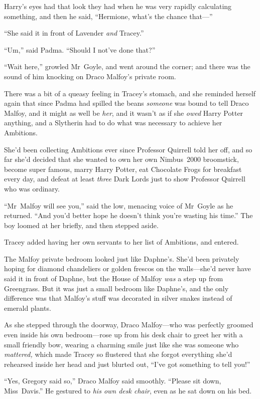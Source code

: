 Harry’s eyes had that look they had when he was very rapidly calculating something, and then he said, “Hermione, what’s the chance that—”

“She said it in front of Lavender \emph{and} Tracey.”

“Um,” said Padma. “Should I not’ve done that?”

\later

“Wait here,” growled Mr~Goyle, and went around the corner; and there was the sound of him knocking on Draco Malfoy’s private room.

There was a bit of a queasy feeling in Tracey’s stomach, and she reminded herself again that since Padma had spilled the beans \emph{someone} was bound to tell Draco Malfoy, and it might as well be \emph{her}, and it wasn’t as if she \emph{owed} Harry Potter anything, and a Slytherin had to do what was necessary to achieve her Ambitions.

She’d been collecting Ambitions ever since Professor Quirrell told her off, and so far she’d decided that she wanted to own her own Nimbus~2000 broomstick, become super famous, marry Harry Potter, eat Chocolate Frogs for breakfast every day, and defeat at least \emph{three} Dark Lords just to show Professor Quirrell who was ordinary.

“Mr~Malfoy will see you,” said the low, menacing voice of Mr~Goyle as he returned. “And you’d better hope he doesn’t think you’re wasting his time.” The boy loomed at her briefly, and then stepped aside.

Tracey added having her own servants to her list of Ambitions, and entered.

The Malfoy private bedroom looked just like Daphne’s. She’d been privately hoping for diamond chandeliers or golden frescos on the walls—she’d never have said it in front of Daphne, but the House of Malfoy \emph{was} a step up from Greengrass. But it was just a small bedroom like Daphne’s, and the only difference was that Malfoy’s stuff was decorated in silver snakes instead of emerald plants.

As she stepped through the doorway, Draco Malfoy—who was perfectly groomed even inside his own bedroom—rose up from his desk chair to greet her with a small friendly bow, wearing a charming smile just like she was someone who \emph{mattered,} which made Tracey so flustered that she forgot everything she’d rehearsed inside her head and just blurted out, “I’ve got something to tell you!”

“Yes, Gregory said so,” Draco Malfoy said smoothly. “Please sit down, Miss~Davis.” He gestured to \emph{his own desk chair}, even as he sat down on his bed.


